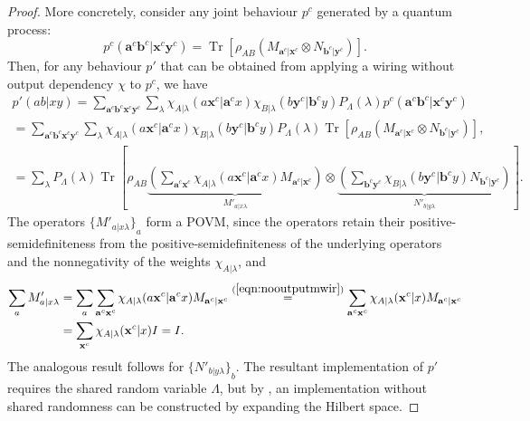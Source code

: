 \documentclass[10pt, a4paper]{article}
\numberwithin{equation}{section} %
\theoremstyle{definition}
\theoremstyle{plain}
\newcommand{\?}{\mathrel{?}} %
\newcommand{\cvec}[1]{\boldsymbol{\mathbf{#1}}}    %
\newcommand{\Tr}[2][]{\mathop{\mathrm{Tr}#1}\left[ #2 \right]} %
\begin{document}
\begin{proof}
              More concretely, consider any joint behaviour \(p^c\) generated by a quantum process:
              \begin{equation}
                p^c(\cvec{a}^c\cvec{b}^c|\cvec{x}^c\cvec{y}^c) = \Tr{\rho_{AB} \left( M_{\cvec{a}^c|\cvec{x}^c} \otimes N_{\cvec{b}^c|\cvec{y}^c} \right) }.
              \end{equation}
              Then, for any behaviour \(p'\) that can be obtained from applying a wiring without output dependency \(\chi\) to \(p^c\), we have
              \begin{gather}
                p'(ab|xy) = \sum_{\cvec{a}^c\cvec{b}^c\cvec{x}^c\cvec{y}^c} \sum_{\lambda} \chi_{A|\lambda}(a\cvec{x}^c|\cvec{a}^cx) \chi_{B|\lambda}(b\cvec{y}^c|\cvec{b}^cy) P_{\Lambda}(\lambda) p^c(\cvec{a}^c\cvec{b}^c|\cvec{x}^c\cvec{y}^c) \\
                = \sum_{\cvec{a}^c\cvec{b}^c\cvec{x}^c\cvec{y}^c} \sum_{\lambda} \chi_{A|\lambda}(a\cvec{x}^c|\cvec{a}^cx) \chi_{B|\lambda}(b\cvec{y}^c|\cvec{b}^cy) P_{\Lambda}(\lambda) \Tr{\rho_{AB} \left( M_{\cvec{a}^c|\cvec{x}^c} \otimes N_{\cvec{b}^c|\cvec{y}^c} \right) }, \\
                = \sum_{\lambda} P_{\Lambda}(\lambda) \Tr{\rho_{AB} \underbrace{\left( \sum_{\cvec{a}^c\cvec{x}^c} \chi_{A|\lambda}(a\cvec{x}^c|\cvec{a}^cx) M_{\cvec{a}^c|\cvec{x}^c} \right)}_{M'_{a|x\lambda}} \otimes \underbrace{\left(\sum_{\cvec{b}^c\cvec{y}^c} \chi_{B|\lambda}(b\cvec{y}^c|\cvec{b}^cy) N_{\cvec{b}^c|\cvec{y}^c} \right)}_{N'_{b|y\lambda}} }.
              \end{gather}
              The operators \({\{M'_{a|x\lambda}\}}_a\) form a POVM, since the operators retain their positive-semidefiniteness from the positive-semidefiniteness of the underlying operators and the nonnegativity of the weights \(\chi_{A|\lambda}\), and
              \begin{align}
                \sum_a M'_{a|x\lambda} &= \sum_a \sum_{\cvec{a}^c\cvec{x}^c} \chi_{A|\lambda}(a\cvec{x}^c|\cvec{a}^cx) M_{\cvec{a}^c|\cvec{x}^c} \stackrel{(\ref{eqn:nooutputmwir})}{=} \sum_{\cvec{a}^c\cvec{x}^c} \chi_{A|\lambda}(\cvec{x}^c|x) M_{\cvec{a}^c|\cvec{x}^c} \\
                                       &= \sum_{\cvec{x}^c} \chi_{A|\lambda}(\cvec{x}^c|x) I = I.
              \end{align}
               The analogous result follows for \({\{N'_{b|y\lambda}\}}_b\). The resultant implementation of \(p'\) requires the shared random variable \(\Lambda\), but by , an implementation without shared randomness can be constructed by expanding the Hilbert space.


\end{proof}
\end{document}
